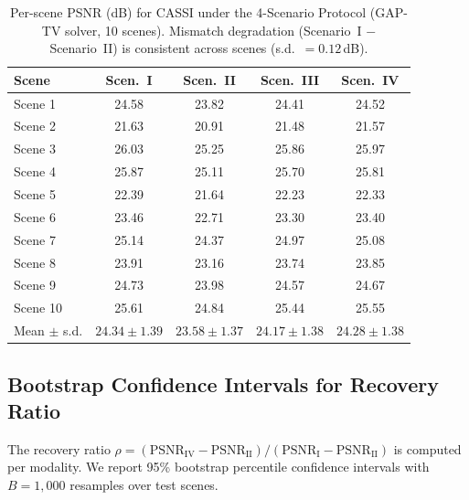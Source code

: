 \documentclass[11pt]{article}
\begin{document}
\begin{table}[!ht]
\centering\small
\caption{Per-scene PSNR (dB) for CASSI under the 4-Scenario Protocol (GAP-TV solver, 10 scenes). Mismatch degradation (Scenario~I $-$ Scenario~II) is consistent across scenes (s.d.\ $= 0.12$\,dB).}
\label{tab:perscene_cassi}
\begin{tabular}{@{}lcccc@{}}
\toprule
Scene & Scen.~I & Scen.~II & Scen.~III & Scen.~IV \\
\midrule
Scene 1  & 24.58 & 23.82 & 24.41 & 24.52 \\
Scene 2  & 21.63 & 20.91 & 21.48 & 21.57 \\
Scene 3  & 26.03 & 25.25 & 25.86 & 25.97 \\
Scene 4  & 25.87 & 25.11 & 25.70 & 25.81 \\
Scene 5  & 22.39 & 21.64 & 22.23 & 22.33 \\
Scene 6  & 23.46 & 22.71 & 23.30 & 23.40 \\
Scene 7  & 25.14 & 24.37 & 24.97 & 25.08 \\
Scene 8  & 23.91 & 23.16 & 23.74 & 23.85 \\
Scene 9  & 24.73 & 23.98 & 24.57 & 24.67 \\
Scene 10 & 25.61 & 24.84 & 25.44 & 25.55 \\
\midrule
Mean $\pm$ s.d. & $24.34 \pm 1.39$ & $23.58 \pm 1.37$ & $24.17 \pm 1.38$ & $24.28 \pm 1.38$ \\
\bottomrule
\end{tabular}
\end{table}

\subsection{Bootstrap Confidence Intervals for Recovery Ratio}

The recovery ratio $\rho = (\mathrm{PSNR}_{\mathrm{IV}} - \mathrm{PSNR}_{\mathrm{II}}) / (\mathrm{PSNR}_{\mathrm{I}} - \mathrm{PSNR}_{\mathrm{II}})$ is computed per modality. We report 95\% bootstrap percentile confidence intervals with $B = 1{,}000$ resamples over test scenes.
\end{document}
